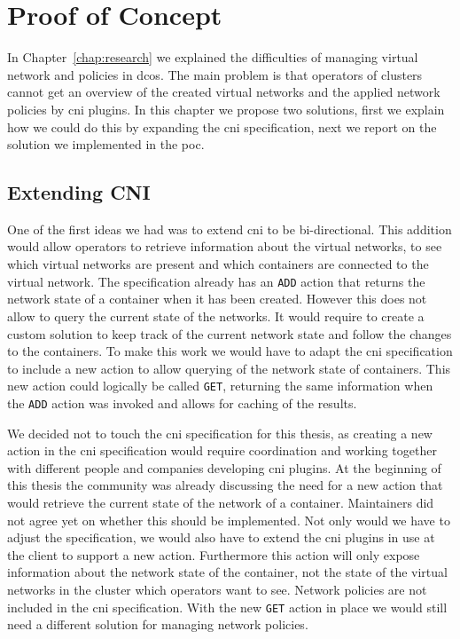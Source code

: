 \chapter{Proof of Concept}
\label{chap:proof-of-concept}
In Chapter~\ref{chap:research} we explained the difficulties of managing virtual network and policies in \gls{dcos}. The main problem is that operators of clusters cannot get an overview of the created virtual networks and the applied network policies by \gls{cni} plugins. In this chapter we propose two solutions, first we explain how we could do this by expanding the \gls{cni} specification, next we report on the solution we implemented in the \gls{poc}. 

\section{Extending CNI}
\label{sec:expanding-cni}
One of the first ideas we had was to extend \gls{cni} to be bi-directional. This addition would allow operators to retrieve information about the virtual networks, to see which virtual networks are present and which containers are connected to the virtual network. The specification already has an \texttt{ADD} action that returns the network state of a container when it has been created. However this does not allow to query the current state of the networks. It would require to create a custom solution to keep track of the current network state and follow the changes to the containers. To make this work we would have to adapt the \gls{cni} specification to include a new action to allow querying of the network state of containers. This new action could logically be called \texttt{GET}, returning the same information when the \texttt{ADD} action was invoked and allows for caching of the results.

We decided not to touch the \gls{cni} specification for this thesis, as creating a new action in the \gls{cni} specification would require coordination and working together with different people and companies developing \gls{cni} plugins. At the beginning of this thesis the community was already discussing the need for a new action that would retrieve the current state of the network of a container. Maintainers did not agree yet on whether this should be implemented. Not only would we have to adjust the specification, we would also have to extend the \gls{cni} plugins in use at the client to support a new action. Furthermore this action will only expose information about the network state of the container, not the state of the virtual networks in the cluster which operators want to see. Network policies are not included in the \gls{cni} specification. With the new \texttt{GET} action in place we would still need a different solution for managing network policies. 

